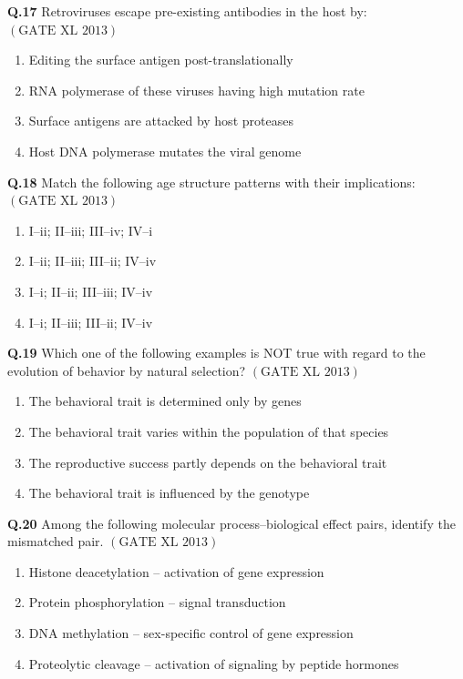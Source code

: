 \documentclass[12pt]{article}
\theoremstyle{remark}
\providecommand{\brak}[1]{\ensuremath{\left(#1\right)}}
\begin{document}
\textbf{Q.17} Retroviruses escape pre-existing antibodies in the host by: \hfill $\brak{\text{GATE XL 2013}}$
\begin{enumerate}
    \item Editing the surface antigen post-translationally
    \item RNA polymerase of these viruses having high mutation rate
    \item Surface antigens are attacked by host proteases
    \item Host DNA polymerase mutates the viral genome
\end{enumerate}

\textbf{Q.18} Match the following age structure patterns with their implications: \hfill $\brak{\text{GATE XL 2013}}$
\begin{enumerate}
    \item I–ii; II–iii; III–iv; IV–i
    \item I–ii; II–iii; III–ii; IV–iv
    \item I–i; II–ii; III–iii; IV–iv
    \item I–i; II–iii; III–ii; IV–iv
\end{enumerate}

\textbf{Q.19} Which one of the following examples is NOT true with regard to the evolution of behavior by natural selection? \hfill $\brak{\text{GATE XL 2013}}$
\begin{enumerate}
    \item The behavioral trait is determined only by genes
    \item The behavioral trait varies within the population of that species
    \item The reproductive success partly depends on the behavioral trait
    \item The behavioral trait is influenced by the genotype
\end{enumerate}

\textbf{Q.20} Among the following molecular process–biological effect pairs, identify the mismatched pair. \hfill $\brak{\text{GATE XL 2013}}$
\begin{enumerate}
    \item Histone deacetylation – activation of gene expression
    \item Protein phosphorylation – signal transduction
    \item DNA methylation – sex-specific control of gene expression
    \item Proteolytic cleavage – activation of signaling by peptide hormones
\end{enumerate}
\end{document}
